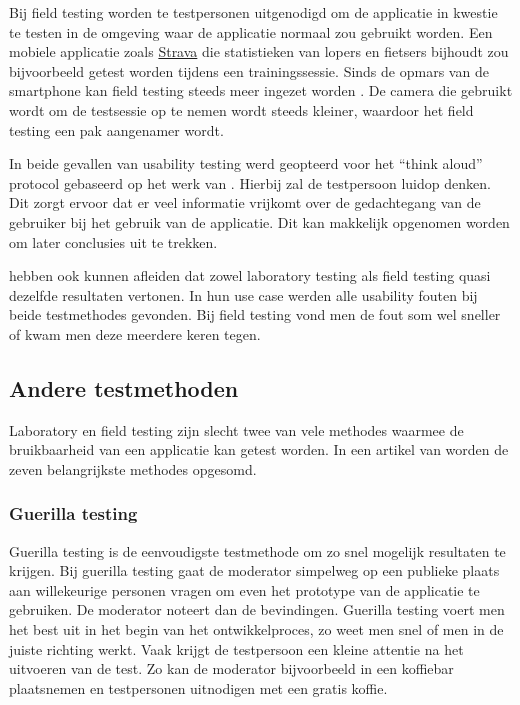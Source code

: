 Bij field testing worden te testpersonen uitgenodigd om de applicatie in kwestie te testen in de omgeving waar de applicatie normaal zou gebruikt worden. Een mobiele applicatie zoals \href{https://www.strava.com/}{Strava} die statistieken van lopers en fietsers bijhoudt zou bijvoorbeeld getest worden tijdens een trainingssessie. Sinds de opmars van de smartphone kan field testing steeds meer ingezet worden \autocite{Kjeldskov2004}. De camera die gebruikt wordt om de testsessie op te nemen wordt steeds kleiner, waardoor het field testing een pak aangenamer wordt.

In beide gevallen van usability testing werd geopteerd voor het ``think aloud'' protocol gebaseerd op het werk van \textcite{Ericsson1984}. Hierbij zal de testpersoon luidop denken. Dit zorgt ervoor dat er veel informatie vrijkomt over de gedachtegang van de gebruiker bij het gebruik van de applicatie. Dit kan makkelijk opgenomen worden om later conclusies uit te trekken.

\textcite{Kaikkonen2005} hebben ook kunnen afleiden dat zowel laboratory testing als field testing quasi dezelfde resultaten vertonen. In hun use case werden alle usability fouten bij beide testmethodes gevonden. Bij field testing vond men de fout som wel sneller of kwam men deze meerdere keren tegen.

\subsection{Andere testmethoden}
\label{sec:usability-testing:testmethoden}

Laboratory en field testing zijn slecht twee van vele methodes waarmee de bruikbaarheid van een applicatie kan getest worden. In een artikel van \textcite{Babich2019} worden de zeven belangrijkste methodes opgesomd.

\subsubsection{Guerilla testing}
\label{sec:usability-testing:testmethoden:guerilla}

Guerilla testing is de eenvoudigste testmethode om zo snel mogelijk resultaten te krijgen. Bij guerilla testing gaat de moderator simpelweg op een publieke plaats aan willekeurige personen vragen om even het prototype van de applicatie te gebruiken. De moderator noteert dan de bevindingen. Guerilla testing voert men het best uit in het begin van het ontwikkelproces, zo weet men snel of men in de juiste richting werkt. Vaak krijgt de testpersoon een kleine attentie na het uitvoeren van de test. Zo kan de moderator bijvoorbeeld in een koffiebar plaatsnemen en testpersonen uitnodigen met een gratis koffie.

